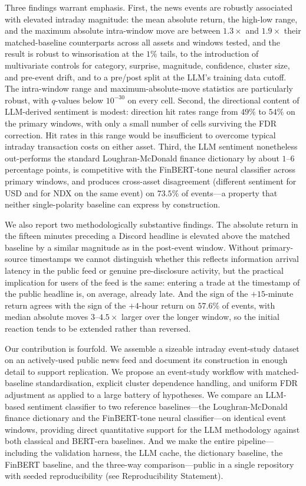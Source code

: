 Three findings warrant emphasis. First, the news events are robustly
associated with elevated intraday magnitude: the mean absolute return,
the high-low range, and the maximum absolute intra-window move are
between $1.3\times$ and $1.9\times$ their matched-baseline counterparts
across all assets and windows tested, and the result is robust to
winsorisation at the $1\%$ tails, to the introduction of multivariate
controls for category, surprise, magnitude, confidence, cluster size,
and pre-event drift, and to a pre/post split at the LLM's training
data cutoff. The intra-window range and maximum-absolute-move
statistics are particularly robust, with $q$-values below
$10^{-30}$ on every cell. Second, the directional content of LLM-derived sentiment
is modest: direction hit rates range from $49\%$ to $54\%$ on the
primary windows, with only a small number of cells surviving the FDR
correction. Hit rates in this range would be insufficient to
overcome typical intraday transaction costs on either asset. Third,
the LLM sentiment nonetheless
out-performs the standard Loughran-McDonald finance dictionary
\citep{loughran2011liability} by about $1$--$6$ percentage points,
is competitive with the FinBERT-tone neural classifier
\citep{yang2020finbert} across primary windows, and produces cross-asset
disagreement (different sentiment for USD and for NDX on the same
event) on $73.5\%$ of events---a property that neither single-polarity
baseline can express by construction.

We also report two methodologically substantive findings. The
absolute return in the fifteen minutes preceding a Discord headline
is elevated above the matched baseline by a similar magnitude as in
the post-event window. Without primary-source timestamps we cannot
distinguish whether this reflects information arrival latency in the
public feed or genuine pre-disclosure activity, but the practical
implication for users of the feed is the same: entering a trade at
the timestamp of the public headline is, on average, already late.
And the sign of the $+15$-minute return agrees with the sign of the
$+4$-hour return on $57.6\%$ of events, with median absolute moves
$3$--$4.5\times$ larger over the longer window, so the initial
reaction tends to be extended rather than reversed.

Our contribution is fourfold. We assemble a sizeable intraday
event-study dataset on an actively-used public news feed and
document its construction in enough detail to support replication.
We propose an event-study workflow with matched-baseline
standardisation, explicit cluster dependence handling, and uniform
FDR adjustment as applied to a large battery of hypotheses. We
compare an LLM-based sentiment classifier to two reference
baselines---the Loughran-McDonald finance dictionary and the
FinBERT-tone neural classifier---on identical event windows,
providing direct quantitative support for the LLM methodology
against both classical and BERT-era baselines. And we make the
entire pipeline---including the validation harness, the LLM cache,
the dictionary baseline, the FinBERT baseline, and the three-way
comparison---public in a single repository with seeded reproducibility
(see Reproducibility Statement).

